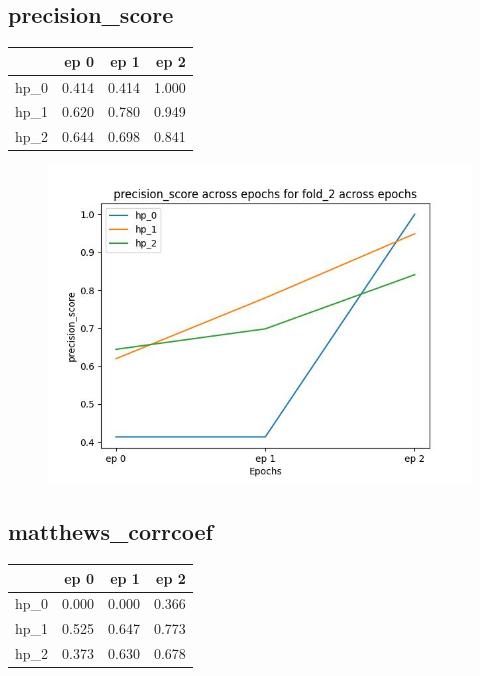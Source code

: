 \documentclass{article}
\begin{document}
\subsection{precision\_score}
\begin{tabular}{lrrr}
\toprule
{} &   ep 0 &   ep 1 &   ep 2 \\
\midrule
hp\_0 &  0.414 &  0.414 &  1.000 \\
hp\_1 &  0.620 &  0.780 &  0.949 \\
hp\_2 &  0.644 &  0.698 &  0.841 \\
\bottomrule
\end{tabular}

\begin{figure}[H]
\includegraphics[scale = 0.75]{fold_2/precision_score}
\end{figure}
\subsection{matthews\_corrcoef}
\begin{tabular}{lrrr}
\toprule
{} &   ep 0 &   ep 1 &   ep 2 \\
\midrule
hp\_0 &  0.000 &  0.000 &  0.366 \\
hp\_1 &  0.525 &  0.647 &  0.773 \\
hp\_2 &  0.373 &  0.630 &  0.678 \\
\bottomrule
\end{tabular}
\end{document}
